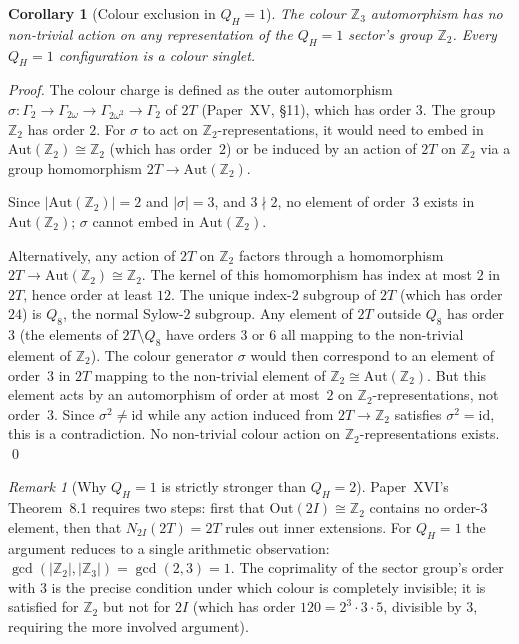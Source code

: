 \documentclass[11pt,a4paper]{article}
\newtheorem{corollary}[theorem]{Corollary}
\theoremstyle{definition}\newtheorem{definition}[theorem]{Definition}
\theoremstyle{remark}
\newtheorem{remark}[theorem]{Remark}
\newcommand{\twoI}{2I}
\newcommand{\twoT}{2T}
\newcommand{\QH}{Q_H}
\newcommand{\Ztwo}{\mathbb{Z}_2}
\newcommand{\Zthree}{\mathbb{Z}_3}
\begin{document}
\begin{corollary}[Colour exclusion in $\QH=1$]
\label{P17:cor:qh1_colour_free}
The colour $\Zthree$ automorphism has no non-trivial action on any
representation of the $\QH=1$ sector's group $\Ztwo$. Every $\QH=1$
configuration is a colour singlet.
\end{corollary}

\begin{proof}
The colour charge is defined as the outer automorphism
$\sigma:\Gamma_2\to\Gamma_{2\omega}\to\Gamma_{2\omega^2}\to\Gamma_2$
of $\twoT$ (Paper~XV, \S11), which has order $3$. The group $\Ztwo$
has order $2$. For $\sigma$ to act on $\Ztwo$-representations, it
would need to embed in $\mathrm{Aut}(\Ztwo)\cong\Ztwo$ (which has
order~$2$) or be induced by an action of $\twoT$ on $\Ztwo$ via a
group homomorphism $\twoT\to\mathrm{Aut}(\Ztwo)$.

Since $|\mathrm{Aut}(\Ztwo)|=2$ and $|\sigma|=3$, and $3\nmid 2$, no
element of order~$3$ exists in $\mathrm{Aut}(\Ztwo)$; $\sigma$
cannot embed in $\mathrm{Aut}(\Ztwo)$.

Alternatively, any action of $\twoT$ on $\Ztwo$ factors through a
homomorphism $\twoT\to\mathrm{Aut}(\Ztwo)\cong\Ztwo$. The kernel of
this homomorphism has index at most $2$ in $\twoT$, hence order at
least $12$. The unique index-$2$ subgroup of $\twoT$ (which has order
$24$) is $Q_8$, the normal Sylow-$2$ subgroup. Any element of $\twoT$
outside $Q_8$ has order~$3$ (the elements of $\twoT\setminus Q_8$
have orders $3$ or $6$ all mapping to the non-trivial element of
$\Ztwo$). The colour generator $\sigma$ would then correspond to an
element of order~$3$ in $\twoT$ mapping to the non-trivial element
of $\Ztwo\cong\mathrm{Aut}(\Ztwo)$. But this element acts
by an automorphism of order at most~$2$ on $\Ztwo$-representations,
not order~$3$. Since $\sigma^2\neq\mathrm{id}$ while any action
induced from $\twoT\to\Ztwo$ satisfies $\sigma^2=\mathrm{id}$, this
is a contradiction. No non-trivial colour action on $\Ztwo$-representations
exists.
\qed
\end{proof}

\begin{remark}[Why $\QH=1$ is strictly stronger than $\QH=2$]
\label{P17:rem:colour_stronger}
Paper~XVI's Theorem~8.1 %
requires two steps: first that $\mathrm{Out}(\twoI)\cong\Ztwo$ contains no
order-$3$ element, then that $N_{\twoI}(\twoT)=\twoT$ rules out inner
extensions. For $\QH=1$ the argument reduces to a single arithmetic
observation: $\gcd(|\Ztwo|,|\Zthree|)=\gcd(2,3)=1$. The coprimality of the
sector group's order with $3$ is the precise condition under which colour
is completely invisible; it is satisfied for $\Ztwo$ but not for $\twoI$
(which has order $120=2^3\cdot3\cdot5$, divisible by $3$, requiring
the more involved argument).
\end{remark}
\end{document}
